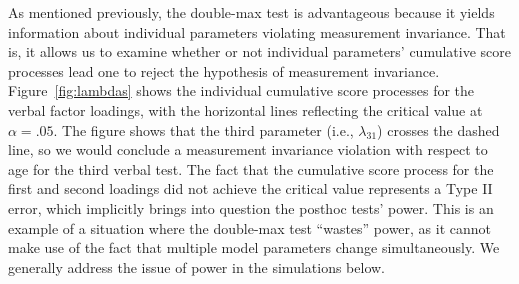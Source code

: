 \documentclass[man]{apa}
\begin{document}
As mentioned previously, the double-max test is advantageous because
it yields information about individual 
parameters violating measurement invariance.  
That is, it allows us to examine whether or not individual parameters' 
cumulative score processes lead one to reject the hypothesis of
measurement invariance.
Figure~\ref{fig:lambdas} shows the individual cumulative score processes for the
verbal factor loadings, with the horizontal lines reflecting the
critical value at $\alpha=.05$.
  The figure
shows that the third parameter (i.e., $\lambda_{31}$) crosses the
dashed line, so we would conclude a measurement 
invariance violation with respect to age for the third
verbal test.  The fact that the cumulative score process for the first
and second loadings did not achieve the critical value represents a Type II
error, which implicitly brings into question the posthoc tests' power.
This is an example of a situation where the double-max test ``wastes''
power, as it cannot make use of the fact that multiple model
parameters change simultaneously.  We
generally address the issue of power in the simulations below.
\end{document}
